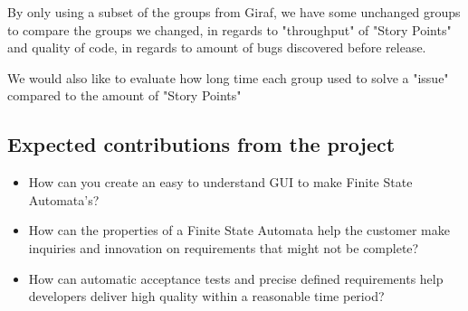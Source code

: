 By only using a subset of the groups from Giraf, we have some unchanged groups to compare the groups we changed, in regards to "throughput" of "Story Points" and quality of code, in regards to amount of bugs discovered before release.

We would also like to evaluate how long time each group used to solve a "issue" compared to the amount of "Story Points" 


\subsection{Expected contributions from the project}
\begin{itemize}
    \item How can you create an easy to understand GUI to make Finite State Automata's?
    \item How can the properties of a Finite State Automata help the customer make inquiries and innovation on requirements that might not be complete?
    \item How can automatic acceptance tests and precise defined requirements help developers deliver high quality within a reasonable time period?
\end{itemize}

